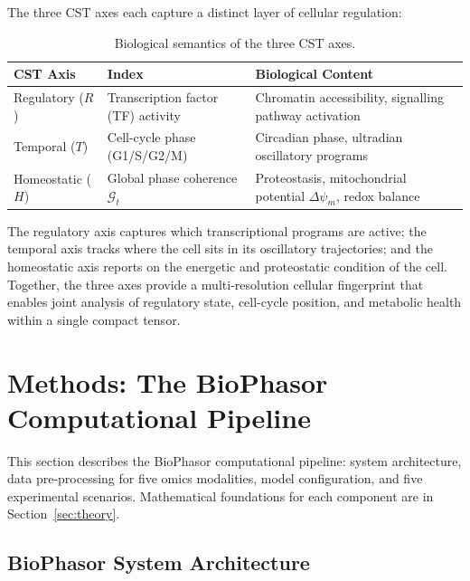 \documentclass[preprint,12pt,amsmath,amssymb,superscriptaddress,floatfix]{revtex4-2}
\begin{document}
The three CST axes each capture a distinct layer of cellular regulation:

\begin{table}[h]
\centering
\caption{Biological semantics of the three CST axes.}
\label{tab:cst_axes}
\begin{tabular}{lll}
\toprule
\textbf{CST Axis} & \textbf{Index} & \textbf{Biological Content} \\
\midrule
Regulatory ($R$)  & Transcription factor (TF) activity & Chromatin accessibility, signalling pathway activation \\
Temporal ($T$)    & Cell-cycle phase (G1/S/G2/M) & Circadian phase, ultradian oscillatory programs \\
Homeostatic ($H$) & Global phase coherence $\mathcal{G}_t$ & Proteostasis, mitochondrial potential $\Delta\psi_m$, redox balance \\
\bottomrule
\end{tabular}
\end{table}

The regulatory axis captures which transcriptional programs are active;
the temporal axis tracks where the cell sits in its oscillatory trajectories;
and the homeostatic axis reports on the energetic and proteostatic
condition of the cell.  Together, the three axes provide a
multi-resolution cellular fingerprint that enables joint analysis of
regulatory state, cell-cycle position, and metabolic health within a
single compact tensor.

\section{Methods: The BioPhasor Computational Pipeline}
\label{sec:methods}

This section describes the BioPhasor computational pipeline: system
architecture, data pre-processing for five omics modalities, model
configuration, and five experimental scenarios.
Mathematical foundations for each component are in Section~\ref{sec:theory}.

\subsection{BioPhasor System Architecture}
\label{subsec:architecture}
\end{document}
